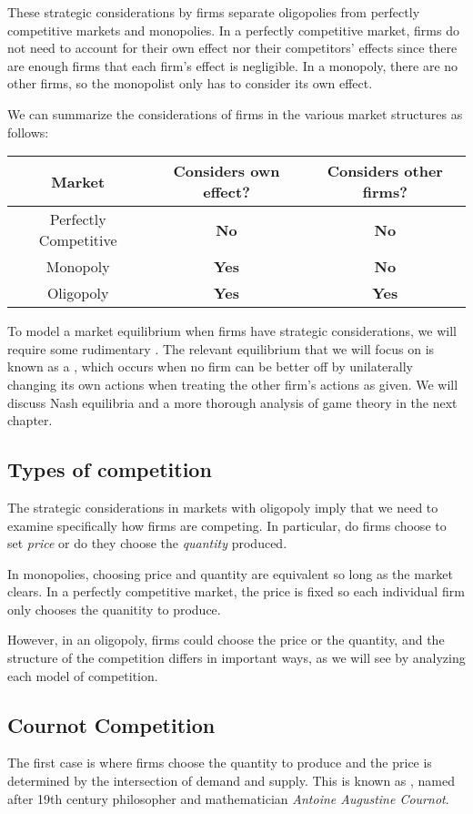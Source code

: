 These strategic considerations by firms separate oligopolies from perfectly competitive markets and monopolies. In a perfectly competitive market, firms do not need to account for their own effect nor their competitors' effects since there are enough firms that each firm's effect is negligible. In a monopoly, there are no other firms, so the monopolist only has to consider its own effect.

We can summarize the considerations of firms in the various market structures as follows:

\begin{center}
\begin{tabular}{c | c  | c}
    Market & Considers own effect? & Considers other firms? \\
    \hline
    Perfectly Competitive & \textbf{No} & \textbf{No} \\
    Monopoly & \textbf{Yes} & \textbf{No} \\
    Oligopoly & \textbf{Yes} & \textbf{Yes}
\end{tabular}
\end{center}

To model a market equilibrium when firms have strategic considerations, we will require some rudimentary . The relevant equilibrium that we will focus on is known as a , which occurs when no firm can be better off by unilaterally changing its own actions when treating the other firm's actions as given. We will discuss Nash equilibria and a more thorough analysis of game theory in the next chapter. 


\subsection*{Types of competition}
The strategic considerations in markets with oligopoly imply that we need to examine specifically how firms are competing. In particular, do firms choose to set \emph{price} or do they choose the \emph{quantity} produced. 

In monopolies, choosing price and quantity are equivalent so long as the market clears. In a perfectly competitive market, the price is fixed so each individual firm only chooses the quanitity to produce.

However, in an oligopoly, firms could choose the price or the quantity, and the structure of the competition differs in important ways, as we will see by analyzing each model of competition.

\subsection{Cournot Competition}
The first case is where firms choose the quantity to produce and the price is determined by the intersection of demand and supply. This is known as , named after 19th century philosopher and mathematician \emph{Antoine Augustine Cournot}. 

